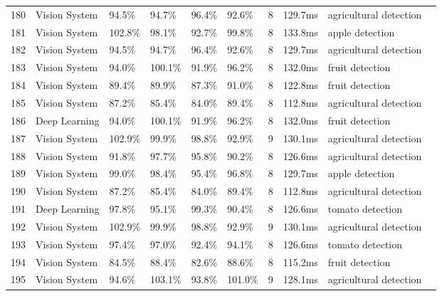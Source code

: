\begin{table*}[htbp]
\begin{tabular}{p{}p{}p{}p{}p{}p{}p{}p{}p{}p{}}
 180 & Vision System & 94.5\% & 94.7\% & 96.4\% & 92.6\% & 8 & 129.7ms & agricultural detection & \cite{liu2017research} \\
 181 & Vision System & 102.8\% & 98.1\% & 92.7\% & 99.8\% & 8 & 133.8ms & apple detection & \cite{gongal2018apple} \\
 182 & Vision System & 94.5\% & 94.7\% & 96.4\% & 92.6\% & 8 & 129.7ms & agricultural detection & \cite{sa2017peduncle} \\
 183 & Vision System & 94.0\% & 100.1\% & 91.9\% & 96.2\% & 8 & 132.0ms & fruit detection & \cite{mu2020design} \\
 184 & Vision System & 89.4\% & 89.9\% & 87.3\% & 91.0\% & 8 & 122.8ms & fruit detection & \cite{peng2018general} \\
 185 & Vision System & 87.2\% & 85.4\% & 84.0\% & 89.4\% & 8 & 112.8ms & agricultural detection & \cite{lalander2015vermicomposting} \\
 186 & Deep Learning & 94.0\% & 100.1\% & 91.9\% & 96.2\% & 8 & 132.0ms & fruit detection & \cite{kirk2020b} \\
 187 & Vision System & 102.9\% & 99.9\% & 98.8\% & 92.9\% & 9 & 130.1ms & agricultural detection & \cite{martos2021ensuring} \\
 188 & Vision System & 91.8\% & 97.7\% & 95.8\% & 90.2\% & 8 & 126.6ms & agricultural detection & \cite{napoli2019phytoextraction} \\
 189 & Vision System & 99.0\% & 98.4\% & 95.4\% & 96.8\% & 8 & 129.7ms & apple detection & \cite{gene2019fruit} \\
 190 & Vision System & 87.2\% & 85.4\% & 84.0\% & 89.4\% & 8 & 112.8ms & agricultural detection & \cite{koenig2015comparative} \\
 191 & Deep Learning & 97.8\% & 95.1\% & 99.3\% & 90.4\% & 8 & 126.6ms & tomato detection & \cite{mu2020intact} \\
 192 & Vision System & 102.9\% & 99.9\% & 98.8\% & 92.9\% & 9 & 130.1ms & agricultural detection & \cite{sumesh2021integration} \\
 193 & Vision System & 97.4\% & 97.0\% & 92.4\% & 94.1\% & 8 & 126.6ms & tomato detection & \cite{liu2019mature} \\
 194 & Vision System & 84.5\% & 88.4\% & 82.6\% & 88.6\% & 8 & 115.2ms & fruit detection & \cite{longsheng2015development} \\
 195 & Vision System & 94.6\% & 103.1\% & 93.8\% & 101.0\% & 9 & 128.1ms & agricultural detection & \cite{visconti2020development} \\

\end{tabular}
\end{table*}

